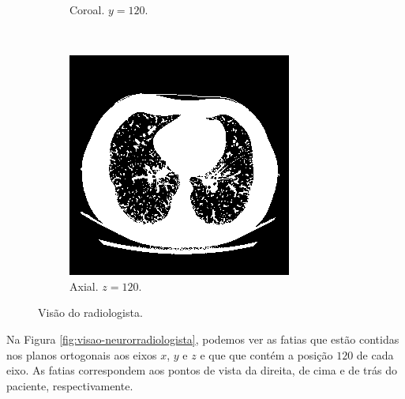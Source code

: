 \documentclass{article}
\begin{document}
\begin{figure}[h]
\begin{subfigure}[b]{0.3\textwidth}
        \caption{Coroal. $y = 120$.}
    \end{subfigure}
    ~
    \begin{subfigure}[b]{0.3\textwidth}
        \includegraphics[width=\textwidth]{thorax/radiologist-axial-gray.png}
        \caption{Axial. $z = 120$.}
    \end{subfigure}
    \caption{Visão do radiologista.}
    \label{fig:visao-radiologisa}
\end{figure}

Na Figura \ref{fig:visao-neurorradiologista}, podemos ver as fatias que estão contidas nos planos ortogonais aos eixos $x$, $y$ e $z$ e que que contém a posição $120$ de cada eixo. As fatias correspondem aos pontos de vista da direita, de cima e de trás do paciente, respectivamente.
\end{document}
